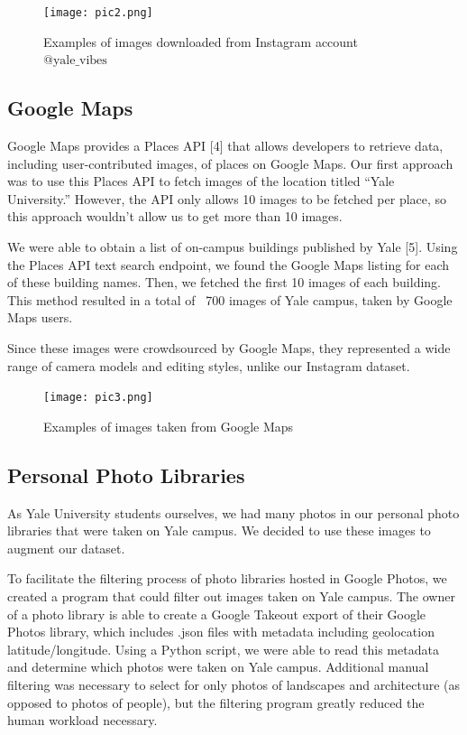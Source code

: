 \documentclass[letterpaper]{article} %
\begin{document}
\begin{figure}
    \centering
    \texttt{[image: pic2.png]}
    \caption{Examples of images downloaded from Instagram account $\text{@yale\_vibes}$}
    \label{fig:enter-label}
\end{figure}


\subsection{Google Maps}
Google Maps provides a Places API [4] that allows developers to retrieve data, including user-contributed images, of places on Google Maps. Our first approach was to use this Places API to fetch images of the location titled “Yale University.” However, the API only allows 10 images to be fetched per place, so this approach wouldn’t allow us to get more than 10 images.

We were able to obtain a list of on-campus buildings published by Yale [5]. Using the Places API text search endpoint, we found the Google Maps listing for each of these building names. Then, we fetched the first 10 images of each building. This method resulted in a total of ~700 images of Yale campus, taken by Google Maps users.

Since these images were crowdsourced by Google Maps, they represented a wide range of camera models and editing styles, unlike our Instagram dataset.

\begin{figure}
    \centering
    \texttt{[image: pic3.png]}
    \caption{Examples of images taken from Google Maps}
    \label{fig:enter-label}
\end{figure}

\subsection{Personal Photo Libraries}
As Yale University students ourselves, we had many photos in our personal photo libraries that were taken on Yale campus. We decided to use these images to augment our dataset.

To facilitate the filtering process of photo libraries hosted in Google Photos, we created a program that could filter out images taken on Yale campus. The owner of a photo library is able to create a Google Takeout export of their Google Photos library, which includes .json files with metadata including geolocation latitude/longitude. Using a Python script, we were able to read this metadata and determine which photos were taken on Yale campus. Additional manual filtering was necessary to select for only photos of landscapes and architecture (as opposed to photos of people), but the filtering program greatly reduced the human workload necessary.
\end{document}
